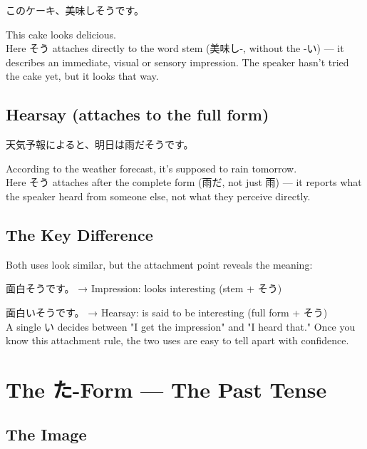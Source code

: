 \documentclass[12pt]{book}
\begin{document}
\par\quad このケーキ、美味しそうです。\\
\par\quad This cake looks delicious.\\

Here そう attaches directly to the word stem (美味し-, without the -い) — it describes an immediate, visual or sensory impression. The speaker hasn't tried the cake yet, but it looks that way.

\section*{Hearsay (attaches to the full form)}

\par\quad 天気予報によると、明日は雨だそうです。\\
\par\quad According to the weather forecast, it's supposed to rain tomorrow.\\

Here そう attaches after the complete form (雨だ, not just 雨) — it reports what the speaker heard from someone else, not what they perceive directly.

\section*{The Key Difference}

Both uses look similar, but the attachment point reveals the meaning:

\par\quad 面白そうです。 → Impression: looks interesting (stem + そう)\\
\par\quad 面白いそうです。 → Hearsay: is said to be interesting (full form + そう)\\

A single い decides between "I get the impression" and "I heard that." Once you know this attachment rule, the two uses are easy to tell apart with confidence.


\chapter{The た-Form — The Past Tense}

\section*{The Image}
\end{document}

